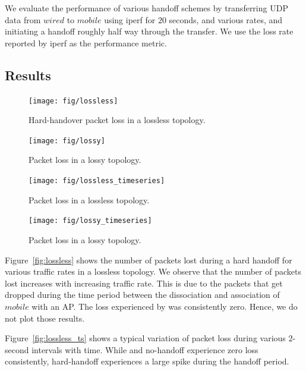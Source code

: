 We evaluate the performance of various handoff schemes by transferring UDP data
from $wired$ to $mobile$ using iperf for $20$ seconds, and various rates, and initiating a 
handoff roughly half way through the transfer. We use the loss rate reported by
iperf as the performance metric.

\subsection{Results}

\begin{figure}[htb!]
\begin{minipage}[t]{0.45\textwidth}
\centerline{\texttt{[image: fig/lossless]}}
\caption{Hard-handover packet loss in a lossless topology.}
\label{fig:lossless}
\end{minipage}
\hfill
\begin{minipage}[t]{0.45\textwidth}
\centerline{\texttt{[image: fig/lossy]}}
\caption{Packet loss in a lossy topology.}
\label{fig:lossy}
\end{minipage}
\hfill
\end{figure}

\begin{figure}[htb!]
\begin{minipage}[t]{0.45\textwidth}
\centerline{\texttt{[image: fig/lossless\_timeseries]}}
\caption{Packet loss in a lossless topology.}
\label{fig:lossless_ts}
\end{minipage}
\hfill
\begin{minipage}[t]{0.45\textwidth}
\centerline{\texttt{[image: fig/lossy\_timeseries]}}
\caption{Packet loss in a lossy topology.}
\label{fig:lossy_ts}
\end{minipage}
\hfill
\end{figure}

Figure~\ref{fig:lossless} shows the number of packets lost during a hard handoff 
for various traffic rates in a lossless topology. 
We observe that the number of packets lost increases
with increasing traffic rate. This is due to the packets that get dropped during
the time period between the dissociation and association of $mobile$ with an AP.
The loss experienced by \sys{} was consistently zero. Hence, we do not plot those results.

Figure~\ref{fig:lossless_ts} shows a typical variation of packet loss during various 
$2$-second intervals with time. While \sys{} and no-handoff experience zero loss consistently,
hard-handoff experiences a large spike during the handoff period.

